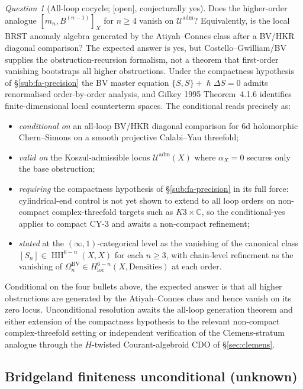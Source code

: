 \documentclass[11pt,reqno]{amsart}
\theoremstyle{plain}
\theoremstyle{definition}
\theoremstyle{remark}
\newtheorem{question}[theorem]{Question}
\providecommand{\ClaimStatusOpen}{\textnormal{[open]}}
\DeclareMathOperator{\HH}{HH}
\newcommand{\Cbb}{\mathbb{C}}
\newcommand{\cU}{\mathcal{U}}
\newcommand{\hbar}{{\hslash}}
\begin{document}
\begin{question}[All-loop cocycle; \ClaimStatusOpen, conjecturally yes]
\label{q:all-loop}
Does the higher-order analogue $[m_n, B^{(n-1)}]_X$ for $n \geq 4$ vanish on $\cU^{\mathrm{adm}}$? Equivalently, is the local BRST anomaly algebra generated by the Atiyah--Connes class after a BV/HKR diagonal comparison? The expected answer is yes, but Costello--Gwilliam/BV supplies the obstruction-recursion formalism, not a theorem that first-order vanishing bootstraps all higher obstructions. Under the compactness hypothesis of \S\ref{sub:fa-precision} the BV master equation $\{S, S\} + \hbar \Delta S = 0$ admits renormalised order-by-order analysis, and Gilkey 1995 Theorem~4.1.6 identifies finite-dimensional local counterterm spaces. The conditional reads precisely as:
\begin{itemize}
  \item \emph{conditional on} an all-loop BV/HKR diagonal comparison for 6d holomorphic Chern--Simons on a smooth projective Calabi--Yau threefold;
  \item \emph{valid on} the Koszul-admissible locus $\cU^{\mathrm{adm}}(X)$ where $\alpha_X=0$ secures only the base obstruction;
  \item \emph{requiring} the compactness hypothesis of \S\ref{sub:fa-precision} in its full force: cylindrical-end control is not yet shown to extend to all loop orders on non-compact complex-threefold targets such as $K3 \times \Cbb$, so the conditional-yes applies to compact CY-$3$ and awaits a non-compact refinement;
  \item \emph{stated} at the $(\infty,1)$-categorical level as the vanishing of the canonical class $[S_n] \in \HH^{6-n}(X, X)$ for each $n \geq 3$, with chain-level refinement as the vanishing of $\Omega_n^{\mathrm{BV}} \in H^{6-n}_{\mathrm{loc}}(X, \mathrm{Densities})$ at each order.
\end{itemize}
Conditional on the four bullets above, the expected answer is that all
higher obstructions are generated by the Atiyah--Connes class and hence
vanish on its zero locus. Unconditional resolution awaits the all-loop
generation theorem and either extension of the compactness hypothesis
to the relevant non-compact complex-threefold setting or independent
verification of the Clemens-stratum analogue through the $H$-twisted
Courant-algebroid CDO of \S\ref{sec:clemens}.
\end{question}

\subsection{Bridgeland finiteness unconditional (unknown)}
\end{document}
